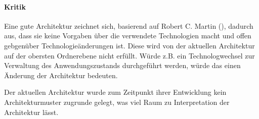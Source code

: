\paragraph{Kritik}
Eine gute Architektur zeichnet sich, basierend auf Robert C. Martin (\citeyear[S. 196 - 197]{Martin2018}), dadurch aus, dass sie keine Vorgaben über die verwendete Technologien macht und offen gebgenüber Technologieänderungen ist. 
Diese wird von der aktuellen Architektur auf der obersten Ordnerebene nicht erfüllt. Würde z.B. ein Technologwechsel zur Verwaltung des Anwendungszustands durchgeführt werden, würde das einen Änderung der Architektur bedeuten.

Der aktuellen Architektur wurde zum Zeitpunkt ihrer Entwicklung kein Architekturmuster zugrunde gelegt, was viel Raum zu Interpretation der Architektur lässt. 


